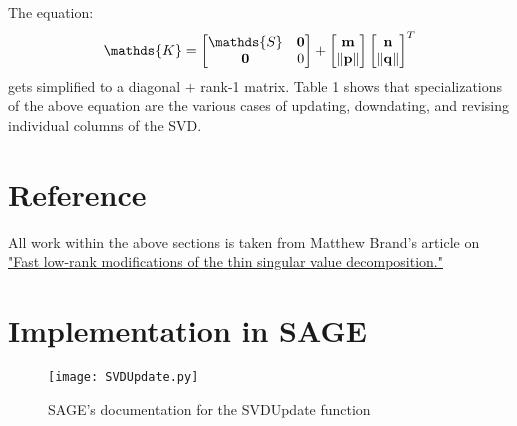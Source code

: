 \documentclass{article}
\begin{document}
\bigskip



The equation:
$$
\mathds{K}=
\begin{bmatrix}
\mathds{S} & \bf{0}\\
\bf{0} & 0
\end{bmatrix}
+
\begin{bmatrix}
\bf{m}\\
\|\bf{p}\|
\end{bmatrix}
\begin{bmatrix}
\bf{n}\\
\|\bf{q}\|
\end{bmatrix}^T
$$
gets simplified to a diagonal $+$ rank-1 matrix.
Table 1 shows that specializations of the above equation are the various cases of updating, downdating, and revising individual columns of the SVD.




\section{Reference\label{reference}}
All work within the above sections is taken from Matthew Brand's article on \href{http://www.stat.osu.edu/~dmsl/thinSVDtracking.pdf}{"Fast low-rank modifications of the thin singular value decomposition."}




\section{Implementation in SAGE\label{sage}}


\begin{figure}[ht!]
\texttt{[image: SVDUpdate.py]}
\caption{SAGE's documentation for the SVDUpdate function}
\label{overflow}
\end{figure}
\end{document}
